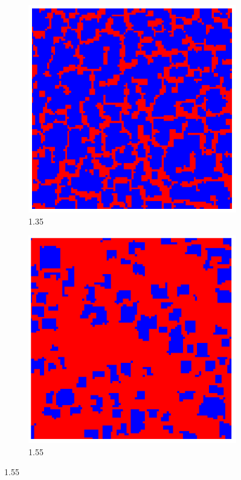 \documentclass[a4paper]{article}
\begin{document}
\begin{figure}[H]
	\begin{subfigure}{.5\textwidth}
		\includegraphics[width=.8\linewidth]{1.35-1.55-1.png}
		\caption{1.35}
	\end{subfigure}
	\begin{subfigure}{.5\textwidth}
		\includegraphics[width=.8\linewidth]{1.35-1.55-2.png}
		\caption{1.55}
	\end{subfigure}%
	

\end{figure}
\end{document}
